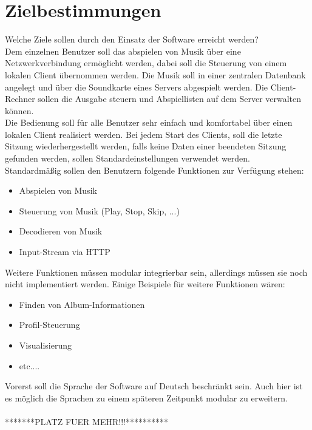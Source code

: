 \chapter{Zielbestimmungen}
Welche Ziele sollen durch den Einsatz der Software erreicht werden?\ \\

Dem einzelnen Benutzer soll das abspielen von Musik über eine Netzwerkverbindung ermöglicht werden, dabei soll die Steuerung von einem lokalen Client übernommen werden. Die Musik soll in einer zentralen Datenbank angelegt und über die Soundkarte eines Servers abgespielt werden. Die Client-Rechner sollen die Ausgabe steuern und Abspiellisten auf dem Server verwalten können.\ \\

Die Bedienung soll für alle Benutzer sehr einfach und komfortabel über einen lokalen Client realisiert werden. Bei jedem Start des Clients, soll die letzte Sitzung wiederhergestellt werden, falls keine Daten einer beendeten Sitzung gefunden werden, sollen Standardeinstellungen verwendet werden.\ \\

Standardmäßig sollen den Benutzern folgende Funktionen zur Verfügung stehen:

\renewcommand{\labelitemi}{•}
\begin{itemize}
	\item Abspielen von Musik
	\item Steuerung von Musik (Play, Stop, Skip, ...)
	\item Decodieren von Musik
	\item Input-Stream via HTTP
\end{itemize}

Weitere Funktionen müssen modular integrierbar sein, allerdings müssen sie noch nicht implementiert werden. Einige Beispiele für weitere Funktionen wären:

\begin{itemize}
	\item Finden von Album-Informationen
	\item Profil-Steuerung
	\item Visualisierung 
	\item etc....
\end{itemize}

Vorerst soll die Sprache der Software auf Deutsch beschränkt sein. Auch hier ist es möglich die Sprachen zu einem späteren Zeitpunkt modular zu erweitern.\ \\ \\

*******PLATZ FUER MEHR!!!**********